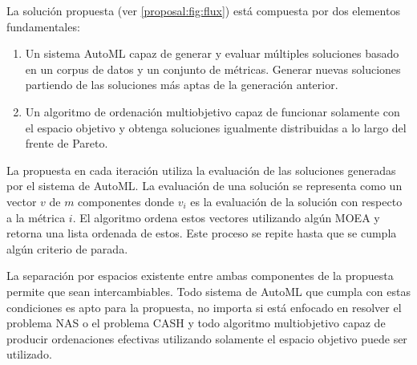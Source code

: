 La soluci\'on propuesta (ver \ref{proposal:fig:flux}) est\'a compuesta por dos elementos fundamentales:
\begin{enumerate}
    \item Un sistema AutoML capaz de generar y evaluar m\'ultiples soluciones basado en un corpus de datos y un conjunto de m\'etricas. Generar nuevas soluciones partiendo de las soluciones m\'as aptas de la generaci\'on anterior.
    \item Un algoritmo de ordenaci\'on multiobjetivo capaz de funcionar solamente con el espacio objetivo y obtenga soluciones igualmente distribuidas a lo largo del frente de Pareto.
\end{enumerate}

La propuesta en cada iteraci\'on utiliza la evaluaci\'on de las soluciones generadas por el sistema de AutoML. La evaluaci\'on de una soluci\'on se representa como un vector $v$ de $m$ componentes donde $v_i$ es la evaluaci\'on de la soluci\'on con respecto a la m\'etrica $i$. El algoritmo ordena estos vectores utilizando alg\'un MOEA y retorna una lista ordenada de estos. Este proceso se repite hasta que se cumpla alg\'un criterio de parada.

La separaci\'on  por espacios existente entre ambas componentes de la propuesta permite que sean intercambiables. Todo sistema de AutoML que cumpla con estas condiciones es apto para la propuesta, no importa si est\'a enfocado en resolver el problema NAS o el problema CASH y todo algoritmo multiobjetivo capaz de producir ordenaciones efectivas utilizando solamente el espacio objetivo puede ser utilizado.


